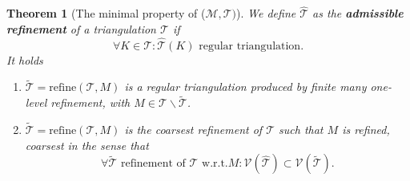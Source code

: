 \documentclass[a4paper,12pt,oneside,fleqn]{book}
\newtheorem{theorem}{Theorem}[section]
\theoremstyle{definition}
\theoremstyle{remark}
\begin{document}
\begin{theorem}[The minimal property of ($\mathcal{M, T})$]
We define $\hat{\mathcal{T}}$ as the \textbf{admissible refinement} of a triangulation $\mathcal{T}$ if 
	\begin{equation}
		\forall K \in \mathcal{T}: \hat{\mathcal{T}}(K) \text{ regular triangulation.}
	\end{equation}
It holds
\begin{enumerate}
	\item $\tilde{\mathcal{T}} = \text{refine}(\mathcal{T}, M)$ is a regular triangulation produced by finite many one-level refinement, with $M \in \mathcal{T} \backslash \tilde{\mathcal{T}}$. 
	\item $\tilde{\mathcal{T}} = \text{refine}(\mathcal{T}, M)$ is the coarsest refinement of $\mathcal{T}$ such that $M$ is refined, coarsest in the sense that
		\begin{equation}
		\forall \tilde{\mathcal{T}} \text{ refinement of } \mathcal{T} \text{ w.r.t.$M$}: \mathcal{V}(\hat{\mathcal{T}}) \subset \mathcal{V}(\tilde{\mathcal{T}}). 
	\end{equation}
\end{enumerate}
\end{theorem}
\end{document}
